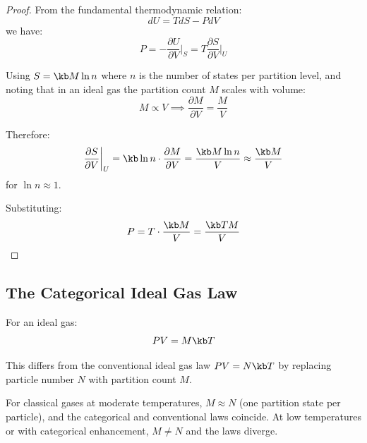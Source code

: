 \begin{proof}
From the fundamental thermodynamic relation:
\begin{equation}
dU = TdS - PdV
\end{equation}
we have:
\begin{equation}
P = -\frac{\partial U}{\partial V}\bigg|_S = T\frac{\partial S}{\partial V}\bigg|_U
\end{equation}

Using $S = \kb M \ln n$ where $n$ is the number of states per partition level, and noting that in an ideal gas the partition count $M$ scales with volume:
\begin{equation}
M \propto V \implies \frac{\partial M}{\partial V} = \frac{M}{V}
\end{equation}

Therefore:
\begin{equation}
\frac{\partial S}{\partial V}\bigg|_U = \kb \ln n \cdot \frac{\partial M}{\partial V} = \frac{\kb M \ln n}{V} \approx \frac{\kb M}{V}
\end{equation}
for $\ln n \approx 1$.

Substituting:
\begin{equation}
P = T \cdot \frac{\kb M}{V} = \frac{\kb T M}{V}
\end{equation}
\end{proof}

\subsection{The Categorical Ideal Gas Law}

\begin{corollary}
\label{cor:ideal_gas}
For an ideal gas:
\begin{equation}
PV = M \kb T
\label{eq:categorical_ideal_gas}
\end{equation}
\end{corollary}

This differs from the conventional ideal gas law $PV = N\kb T$ by replacing particle number $N$ with partition count $M$.

\begin{remark}
For classical gases at moderate temperatures, $M \approx N$ (one partition state per particle), and the categorical and conventional laws coincide. At low temperatures or with categorical enhancement, $M \neq N$ and the laws diverge.
\end{remark}

